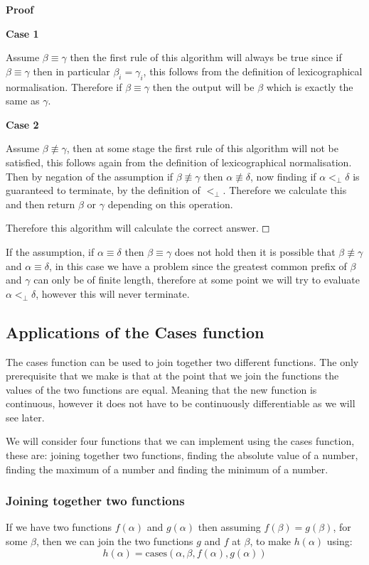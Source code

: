 \documentclass{cs4rep}
\begin{document}
{\bf Proof}

{\bf Case 1}

Assume $\beta \equiv \gamma$ then the first rule of this algorithm
will always be true since if $\beta \equiv \gamma$ then in particular
$\beta_{i} = \gamma_{i}$, this follows from the definition of
lexicographical normalisation. Therefore if $\beta \equiv \gamma$ then
the output will be $\beta$ which is exactly the same as $\gamma$.

{\bf Case 2}

Assume $\beta \not\equiv \gamma$, then at some stage the first rule of
this algorithm will not be satisfied, this follows again from the
definition of lexicographical normalisation. Then by negation of the
assumption if $\beta \not\equiv \gamma$ then $\alpha \not\equiv
\delta$, now finding if $\alpha <_{\perp} \delta$ is guaranteed to
terminate, by the definition of $<_{\perp}$. Therefore we calculate
this and then return $\beta$ or $\gamma$ depending on this operation.


Therefore this algorithm will calculate the correct answer. \hfill
$\boxempty$

If the assumption, if $\alpha \equiv \delta$ then $\beta \equiv
\gamma$ does not hold then it is possible that $\beta \not\equiv
\gamma$ and $\alpha \equiv \delta$, in this case we have a problem
since the greatest common prefix of $\beta$ and $\gamma$ can only be
of finite length, therefore at some point we will try to evaluate $\alpha <_{\perp} \delta$, however this will never terminate.


\subsection*{Applications of the Cases function}

The cases function can be used to join together two different
functions. The only prerequisite that we make is that at the point
that we join the functions the values of the two functions are equal.
Meaning that the new function is continuous, however it does not have
to be continuously differentiable as we will see later.

We will consider four functions that we can implement using the cases
function, these are: joining together two functions, finding the
absolute value of a number, finding the maximum of a number and
finding the minimum of a number.

\subsubsection*{Joining together two functions}
If we have two functions $f(\alpha)$ and $g(\alpha)$ then assuming
$f(\beta)=g(\beta)$, for some $\beta$, then we can join the two
functions $g$ and $f$ at $\beta$, to make $h(\alpha)$ using:
\[ h(\alpha) = \mbox{cases}(\alpha,\beta,f(\alpha),g(\alpha)) \]
\end{document}
